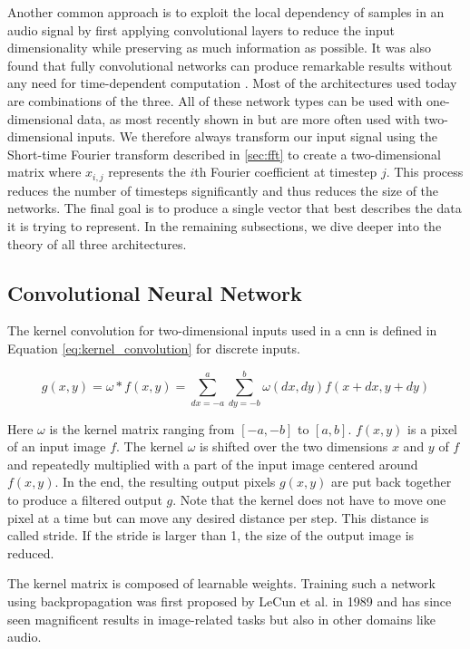 Another common approach is to exploit the local dependency of samples in an audio signal by first applying convolutional layers to reduce the input dimensionality while preserving as much information as possible. It was also found that fully convolutional networks can produce remarkable results without any need for time-dependent computation \cite{fu2017raw}. Most of the architectures used today are combinations of the three. All of these network types can be used with one-dimensional data, as most recently shown in \cite{dhariwal2020jukebox} but are more often used with two-dimensional inputs. We therefore always transform our input signal using the Short-time Fourier transform described in \ref{sec:fft} to create a two-dimensional matrix where $x_{i,j}$ represents the $i$th Fourier coefficient at timestep $j$. This process reduces the number of timesteps significantly and thus reduces the size of the networks. The final goal is to produce a single vector that best describes the data it is trying to represent. In the remaining subsections, we dive deeper into the theory of all three architectures.

\subsection{Convolutional Neural Network}

The kernel convolution for two-dimensional inputs used in a \gls{cnn} is defined in Equation \ref{eq:kernel_convolution} for discrete inputs.

\begin{equation}
   g(x,y) = \omega * f(x,y) = \sum_{dx=-a}^a \sum_{dy=-b}^b \omega (dx,dy) f(x + dx, y + dy)
   \label{eq:kernel_convolution}
\end{equation}

Here $\omega$ is the kernel matrix ranging from $[-a,-b]$ to $[a,b]$. $f(x,y)$ is a pixel of an input image $f$. The kernel $\omega$ is shifted over the two dimensions $x$ and $y$ of $f$ and repeatedly multiplied with a part of the input image centered around $f(x,y)$. In the end, the resulting output pixels $g(x,y)$ are put back together to produce a filtered output $g$. Note that the kernel does not have to move one pixel at a time but can move any desired distance per step. This distance is called stride. If the stride is larger than 1, the size of the output image is reduced.

The kernel matrix is composed of learnable weights. Training such a network using backpropagation was first proposed by LeCun et al. in 1989 \cite{lecun1989backpropagation} and has since seen magnificent results in image-related tasks but also in other domains like audio.

